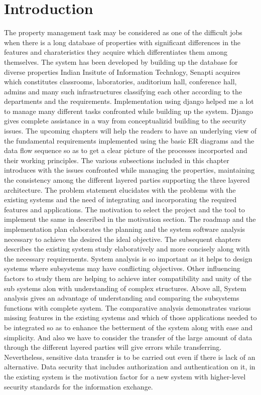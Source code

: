 \documentclass[12pt]{report}
\begin{document}
\tableofcontents
\listoffigures

\chapter{Introduction}
The property management task may be considered as one of the difficult jobs when there is a long database of properties with significant differences in the features and charateristics they acquire which differentiates them among themselves. The system has been developed by building up the database for diverse properties Indian Insitute of Information Technlogy, Senapti acquires which constitutes classrooms, laboratories, auditorium hall, conference hall, admins and many such infrastructures classifying each other according to the departments and the requirements. Implementation using django helped me a lot to manage many different tasks confronted while building up the system. Django gives complete assistance in a way from conceptualizid building to the security issues. The upcoming chapters will help the readers to have an underlying view of the fundamental requirements implemented using the basic ER diagrams and the data flow sequence so as to get a clear picture of the processes incorported and their working principles.  \newline
The various subsections included in this chapter introduces with the issues confronted while managing the properties, maintaining the consistency among the different layered parties supporting the three layered architecture. The problem statement elucidates with the problems with the existing systems and the need of integrating and incorporating the required features and applications. The motivation to select the project and the tool to implement the same in described in the motivation section. The roadmap and the implementation plan elaborates the planning and the system software analysis necessary to achieve the desired the ideal objective. \newline
The subsequent chapters describes the existing system study elaboratively and more concisely along with the necessary requirements. System analysis is so important as it helps to design systems where subsystems may have conflicting objectives. Other influencing factors to study them are helping to achieve inter compatibility and unity of the sub systems alon with understanding of complex structures. Above all, System analysis gives an advantage of understanding and comparing the subsystems functions with complete system. The comparative analysis demonstrates various missing features in the existing systems and which of those applications needed to be integrated so as to enhance the betterment of the system along with ease and simplicity.  And also we have to consider the transfer of the large amount of data through the different layered parties will give errors while transferring. Nevertheless, sensitive data transfer is to be carried out even if there is lack of an alternative. Data security that includes authorization and authentication on it, in the existing system is the motivation factor for a new system with higher-level security standards for the information exchange.  \newline 
\end{document}
